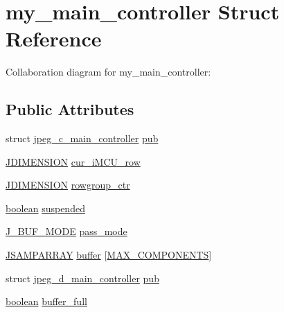 \hypertarget{structmy__main__controller}{}\section{my\+\_\+main\+\_\+controller Struct Reference}
\label{structmy__main__controller}


Collaboration diagram for my\+\_\+main\+\_\+controller\+:
\subsection*{Public Attributes}
\begin{DoxyCompactItemize}
\item 
struct \hyperlink{structjpeg__c__main__controller}{jpeg\+\_\+c\+\_\+main\+\_\+controller} \hyperlink{structmy__main__controller_af6cfb28f856f55e4a715c8036f08c52f}{pub}
\item 
\hyperlink{jmorecfg_8h_a04ed4674f6f1d0d50ec241531e38274f}{J\+D\+I\+M\+E\+N\+S\+I\+O\+N} \hyperlink{structmy__main__controller_a1c6081c98910d41e03fa33763a832a6f}{cur\+\_\+i\+M\+C\+U\+\_\+row}
\item 
\hyperlink{jmorecfg_8h_a04ed4674f6f1d0d50ec241531e38274f}{J\+D\+I\+M\+E\+N\+S\+I\+O\+N} \hyperlink{structmy__main__controller_a41bedbcd86bdc7611550440e02b8f93b}{rowgroup\+\_\+ctr}
\item 
\hyperlink{jmorecfg_8h_a7c6368b321bd9acd0149b030bb8275ed}{boolean} \hyperlink{structmy__main__controller_aaae0f416fa5716cf5e0d295a191b2186}{suspended}
\item 
\hyperlink{jpegint_8h_a1f0803342372ac62b6903c399399c874}{J\+\_\+\+B\+U\+F\+\_\+\+M\+O\+D\+E} \hyperlink{structmy__main__controller_a2de588274979de6f92951740a6e9d0ac}{pass\+\_\+mode}
\item 
\hyperlink{jpeglib_8h_ac9d5d1b829ed51769db69a37271a7e91}{J\+S\+A\+M\+P\+A\+R\+R\+A\+Y} \hyperlink{structmy__main__controller_a448676ac307b69b99e5457744515f058}{buffer} \mbox{[}\hyperlink{jmorecfg_8h_a6d8c910a1fdb6d4762a05f7250e64322}{M\+A\+X\+\_\+\+C\+O\+M\+P\+O\+N\+E\+N\+T\+S}\mbox{]}
\item 
struct \hyperlink{structjpeg__d__main__controller}{jpeg\+\_\+d\+\_\+main\+\_\+controller} \hyperlink{structmy__main__controller_a4880459c57978ea5fcfef2a1acbfc3fe}{pub}
\item 
\hyperlink{jmorecfg_8h_a7c6368b321bd9acd0149b030bb8275ed}{boolean} \hyperlink{structmy__main__controller_a6cd3c916b4d87c97f6fda7daa0816256}{buffer\+\_\+full}
\item 

\end{DoxyCompactItemize}
